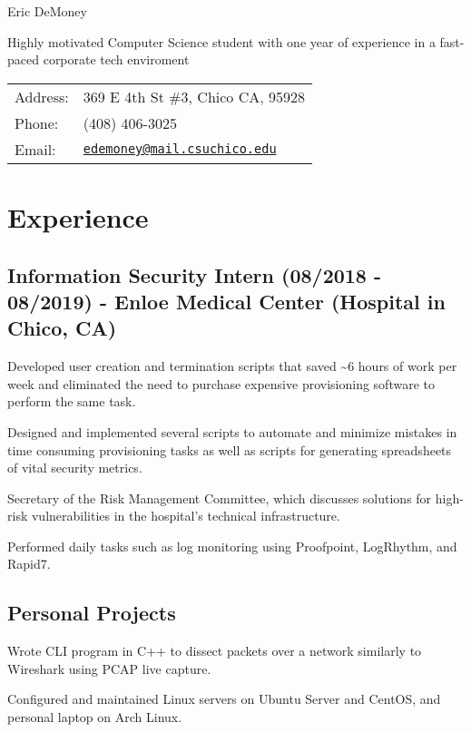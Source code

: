 \documentclass[letterpaper]{article}
\def\name{Eric DeMoney}
\renewenvironment{itemize}{
  \begin{list}{}{
    \setlength{\leftmargin}{1.5em}
  }
}{
  \end{list}
}
\begin{document}
{\huge \name}



\begin{minipage}{0.475\linewidth}
    Highly motivated Computer Science student with one year of experience in a fast-paced corporate tech enviroment
\end{minipage}
\hspace{0.125cm}
\begin{minipage}{0.475\linewidth}
  \begin{tabular}{ll}
    Address: & 369 E 4th St \#3, Chico CA, 95928\\
    Phone: & (408) 406-3025 \\
    Email: & \href{mailto:edemoney@mail.csuchico.edu}{\tt edemoney@mail.csuchico.edu} \\
  \end{tabular}
\end{minipage}

\section*{Experience}
\subsection*{Information Security Intern (08/2018 - 08/2019) - Enloe Medical Center (Hospital in Chico, CA)
}
\begin{itemize}
 \item Developed user creation and termination scripts that saved \textasciitilde 6 hours of work per week and eliminated the need to purchase expensive provisioning software to perform the same task.
 \item Designed and implemented several scripts to automate and minimize mistakes in time consuming provisioning tasks as well as scripts for generating spreadsheets of vital security metrics.
 \item Secretary of the Risk Management Committee, which discusses solutions for high-risk vulnerabilities in the hospital's technical infrastructure.
 \item Performed daily tasks such as log monitoring using Proofpoint, LogRhythm, and Rapid7.
\end{itemize}
\subsection*{Personal Projects}
\begin{itemize}
    \item Wrote CLI program in C++ to dissect packets over a network similarly to Wireshark using PCAP live capture.
    \item Configured and maintained Linux servers on Ubuntu Server and CentOS, and personal laptop on Arch Linux.
\end{itemize}
\end{document}
